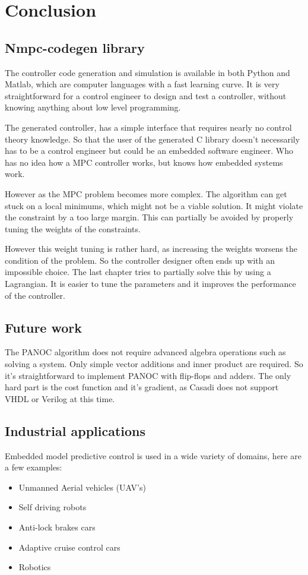 \chapter{Conclusion}
\label{cha:conclusion}

\section{Nmpc-codegen library}
The controller code generation and simulation is available in both Python and Matlab, which are computer languages with a fast learning curve. It is very straightforward for a control engineer to design and test a controller, without knowing anything about low level programming.

The generated controller, has a simple interface that requires nearly no control theory knowledge. So that the user of the generated C library doesn't necessarily has to be a control engineer but could be an embedded software engineer. Who has no idea how a MPC controller works, but knows how embedded systems work.

However as the MPC problem becomes more complex. The algorithm can get stuck on a local minimums, which might not be a viable solution. It might violate the constraint by a too large margin. This can partially be avoided by properly tuning the weights of the constraints. 

However this weight tuning is rather hard, as increasing the weights worsens the condition of the problem. So the controller designer often ends up with an impossible choice. The last chapter tries to partially solve this by using a Lagrangian. It is easier to tune the parameters and it improves the performance of the controller. 

\section{Future work}
The PANOC algorithm does not require advanced algebra operations such as solving a system. Only simple vector additions and inner product are required. So it's straightforward to implement PANOC with flip-flops and adders. The only hard part is the cost function and it's gradient, as Casadi does not support VHDL or Verilog at this time.

\section{Industrial applications}
Embedded model predictive control is used in a wide variety of domains, here are a few examples:
\begin{itemize}
	\item Unmanned Aerial vehicles (UAV's)
	\item Self driving robots
	\item Anti-lock brakes cars
	\item Adaptive cruise control cars
	\item Robotics
\end{itemize}

